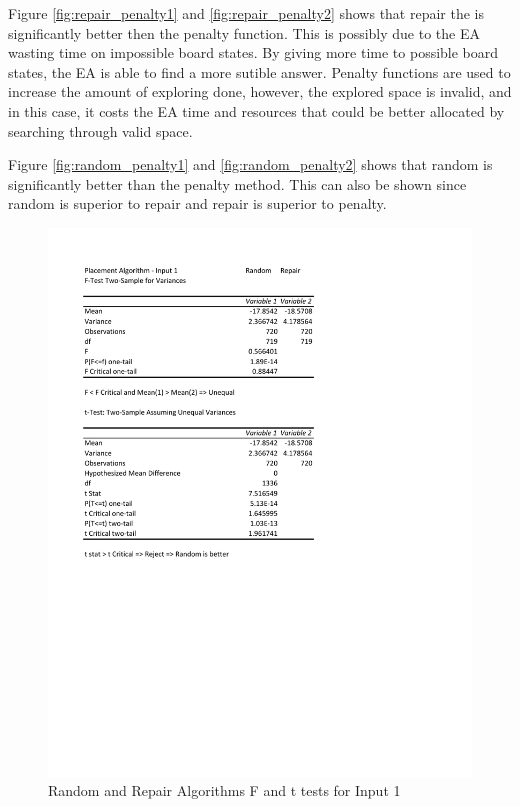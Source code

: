 \documentclass[times]{article}
\begin{document}
	Figure \ref{fig:repair_penalty1} and \ref{fig:repair_penalty2} shows that repair the is significantly better then the penalty function. This is possibly due to the EA wasting time on impossible board states. By giving more time to possible board states, the EA is able to find a more sutible answer. Penalty functions are used to increase the amount of exploring done, however, the explored space is invalid, and in this case, it costs the EA time and resources that could be better allocated by searching through valid space.

	Figure \ref{fig:random_penalty1} and \ref{fig:random_penalty2} shows that random is significantly better than the penalty method. This can also be shown since random is superior to repair and repair is superior to penalty.


	\begin{figure}
		\caption{Random and Repair Algorithms F and t tests for Input 1}
		\label{fig:random_repair1}
		\includegraphics[width=\textwidth]{./t_test/Random_Repair1}
	\end{figure}
\end{document}
